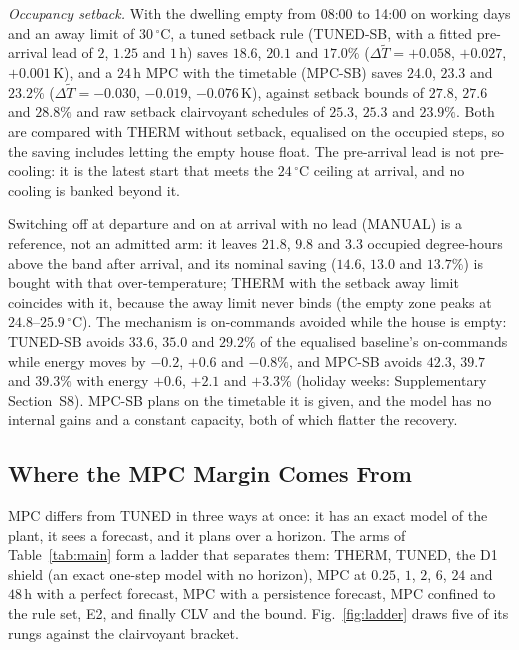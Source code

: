 \documentclass[3p,twocolumn,number]{elsarticle}
\begin{document}
\emph{Occupancy setback.} With the dwelling empty from 08:00 to 14:00 on working days and an away limit of $30\,^\circ$C, a tuned setback rule (TUNED-SB, with a fitted pre-arrival lead of $2$, $1.25$ and $1\,$h) saves $18.6$, $20.1$ and $17.0\%$ ($\Delta\tilde T=+0.058$, $+0.027$, $+0.001\,$K), and a $24\,$h MPC with the timetable (MPC-SB) saves $24.0$, $23.3$ and $23.2\%$ ($\Delta\tilde T=-0.030$, $-0.019$, $-0.076\,$K), against setback bounds of $27.8$, $27.6$ and $28.8\%$ and raw setback clairvoyant schedules of $25.3$, $25.3$ and $23.9\%$. Both are compared with THERM without setback, equalised on the occupied steps, so the saving includes letting the empty house float. The pre-arrival lead is not pre-cooling: it is the latest start that meets the $24\,^\circ$C ceiling at arrival, and no cooling is banked beyond it.

Switching off at departure and on at arrival with no lead (MANUAL) is a reference, not an admitted arm: it leaves $21.8$, $9.8$ and $3.3$ occupied degree-hours above the band after arrival, and its nominal saving ($14.6$, $13.0$ and $13.7\%$) is bought with that over-temperature; THERM with the setback away limit coincides with it, because the away limit never binds (the empty zone peaks at $24.8$--$25.9\,^\circ$C). The mechanism is on-commands avoided while the house is empty: TUNED-SB avoids $33.6$, $35.0$ and $29.2\%$ of the equalised baseline's on-commands while energy moves by $-0.2$, $+0.6$ and $-0.8\%$, and MPC-SB avoids $42.3$, $39.7$ and $39.3\%$ with energy $+0.6$, $+2.1$ and $+3.3\%$ (holiday weeks: Supplementary Section~S8). MPC-SB plans on the timetable it is given, and the model has no internal gains and a constant capacity, both of which flatter the recovery.


\subsection{Where the MPC Margin Comes From}
\label{subsec:ladder}

MPC differs from TUNED in three ways at once: it has an exact model of the plant, it sees a forecast, and it plans over a horizon. The arms of Table~\ref{tab:main} form a ladder that separates them: THERM, TUNED, the D1 shield (an exact one-step model with no horizon), MPC at $0.25$, $1$, $2$, $6$, $24$ and $48\,$h with a perfect forecast, MPC with a persistence forecast, MPC confined to the rule set, E2, and finally CLV and the bound. Fig.~\ref{fig:ladder} draws five of its rungs against the clairvoyant bracket.
\end{document}

